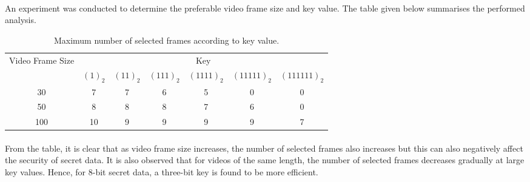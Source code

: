 {{        \paragraph{} An experiment was conducted to determine the preferable video frame size and key value. The table given below summarises the performed analysis.\\[2\baselineskip]
        \begin{table}
            \begin{tabular}{ |c|c|c|c|c|c|c| }
                \hline
                \multirow{2}{*}{Video Frame Size} &
                    \multicolumn{6}{c|}{Key}\\
                \cline{2-7}
                & $(1)_2$ & $(11)_2$ & $(111)_2$ & $(1111)_2$ & $(11111)_2$ & $(111111)_2$\\
                \hline
                30 & 7 & 7 & 6 & 5 & 0 & 0\\
                \hline
                50 & 8 & 8 & 8 & 7 & 6 & 0\\
                \hline
                100 & 10 & 9 & 9 & 9 & 9 & 7\\
                \hline
            \end{tabular}
            \caption{\label{Table1}Maximum number of selected frames according to key value.}
        \end{table}
        \paragraph{} From the table, it is clear that as video frame size increases, the number of selected frames also increases but this can also negatively affect the security of secret data. It is also observed that for videos of the same length, the number of selected frames decreases gradually at large key values. Hence, for 8-bit secret data, a three-bit key is found to be more efficient.
    }
}
